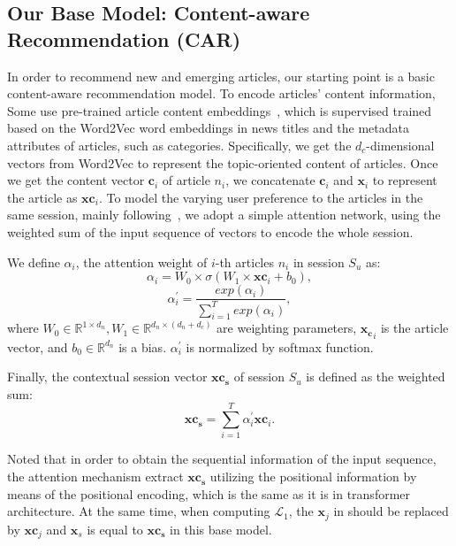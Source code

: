 \subsection{Our Base Model: Content-aware Recommendation (CAR)}
\label{sec: base}
In order to recommend new and emerging articles,
our starting point is a basic content-aware recommendation model. 
To encode articles' content information, 
Some use pre-trained article content embeddings~\cite{gabriel2019contextual}, 
which is supervised trained based on the Word2Vec word embeddings in news titles and the metadata attributes of articles, such as categories.
Specifically, we get the $d_c$-dimensional vectors from Word2Vec to represent the 
topic-oriented content of articles. Once we get the content vector $\mathbf{c}_i$ of 
article $n_i$, we concatenate $\mathbf{c}_i$ and $\mathbf{x}_i$ to represent 
the article as $\mathbf{xc}_i$. 
To model the varying user preference to the articles in the same session, mainly following~\cite{liu2018stamp}, we adopt a simple attention network, using the weighted sum of the input sequence of vectors to encode the whole session.

We define $\alpha_i$, the attention weight of $i$-th articles $n_i$ in session $S_u$ as:
\begin{equation}
    \label{eq:alpha}
    \alpha_i = W_0 \times \sigma (W_1 \times \mathbf{xc}_i +  b_0),
\end{equation}
\begin{equation}
    \alpha_i^{\prime} = \frac{exp(\alpha_i)}{\sum_{i=1}^T exp(\alpha_i)},
\end{equation}
where $W_0\in \mathbb{R}^{1 \times d_n}, W_1 \in \mathbb{R}^{d_n\times (d_n+d_c)}$ 
are weighting parameters, $\mathbf{x_{c}}_i$ is the article vector, 
and $b_0\in \mathbb{R}^{d_n}$ is a bias. $\alpha_i^{\prime}$ is normalized by softmax function.

Finally, the contextual session vector $\mathbf{xc_s}$ of session $S_u$ is defined as the weighted sum:
\begin{equation}
    \label{eq:final_repre}
    \mathbf{xc_s} = \sum_{i=1}^{T} \alpha_i^{\prime} \mathbf{xc}_i.
\end{equation}

Noted that in order to obtain the sequential information of the input sequence, the attention mechanism extract $\mathbf{xc_s}$ utilizing the positional information by means of the positional encoding, which is the same as it is in transformer architecture.
At the same time, when computing $\mathcal{L}_1$, the $\mathbf{x}_j$ in  should be replaced by $\mathbf{xc}_j$ and $\mathbf{x}_s$ is equal to $\mathbf{xc_s}$ in this base model.

